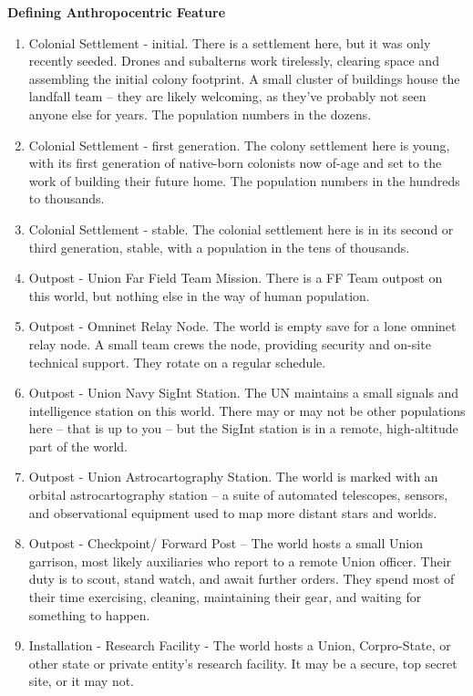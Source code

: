\textbf{Defining Anthropocentric Feature}
\begin{enumerate}
    \item Colonial Settlement - initial. There is a settlement here, but it was only recently seeded. Drones and subalterns work tirelessly, clearing space and assembling the initial colony footprint. A small cluster of buildings house the landfall team -- they are likely welcoming, as they’ve probably not seen anyone else for years. The population numbers in the dozens.
    \item Colonial Settlement - first generation. The colony settlement here is young, with its first generation of native-born colonists now of-age and set to the work of building their future home. The population numbers in the hundreds to thousands.
    \item Colonial Settlement - stable. The colonial settlement here is in its second or third generation, stable, with a population in the tens of thousands.
    \item Outpost - Union Far Field Team Mission. There is a FF Team outpost on this world, but nothing else in the way of human population.
    \item Outpost - Omninet Relay Node. The world is empty save for a lone omninet relay node. A small team crews the node, providing security and on-site technical support. They rotate on a regular schedule.
    \item Outpost - Union Navy SigInt Station. The UN maintains a small signals and intelligence station on this world. There may or may not be other populations here -- that is up to you -- but the SigInt station is in a remote, high-altitude part of the world.
    \item Outpost - Union Astrocartography Station. The world is marked with an orbital astrocartography station -- a suite of automated telescopes, sensors, and observational equipment used to map more distant stars and worlds.
    \item Outpost - Checkpoint/ Forward Post -- The world hosts a small Union garrison, most likely auxiliaries who report to a remote Union officer. Their duty is to scout, stand watch, and await further orders. They spend most of their time exercising, cleaning, maintaining their gear, and waiting for something to happen.
    \item Installation - Research Facility - The world hosts a Union, Corpro-State, or other state or private entity’s research facility. It may be a secure, top secret site, or it may not.

\end{enumerate}
